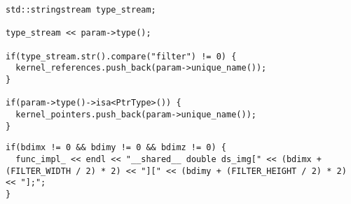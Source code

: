 \documentclass{article}
\begin{document}
\begin{verbatim}
std::stringstream type_stream;

type_stream << param->type();

if(type_stream.str().compare("filter") != 0) {
  kernel_references.push_back(param->unique_name());
}

if(param->type()->isa<PtrType>()) {
  kernel_pointers.push_back(param->unique_name());
}
\end{verbatim}

\begin{verbatim}
if(bdimx != 0 && bdimy != 0 && bdimz != 0) {
  func_impl_ << endl << "__shared__ double ds_img[" << (bdimx + (FILTER_WIDTH / 2) * 2) << "][" << (bdimy + (FILTER_HEIGHT / 2) * 2) << "];";
}
\end{verbatim}
\end{document}
